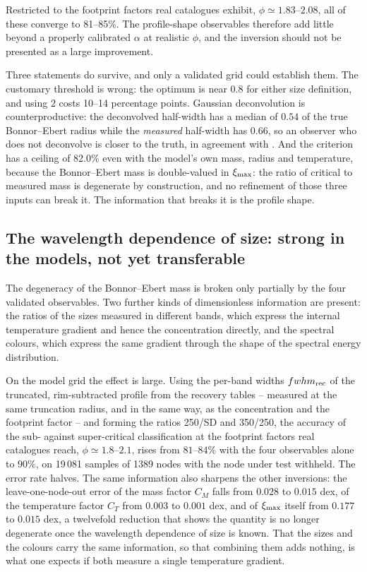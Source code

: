 \documentclass[11pt,a4paper]{article}
\begin{document}
Restricted to the footprint factors real catalogues exhibit, $\phi\simeq
1.83$--$2.08$, all of these converge to 81--85\%. The profile-shape
observables therefore add little beyond a properly calibrated $\alpha$ at
realistic $\phi$, and the inversion should not be presented as a large
improvement.

Three statements do survive, and only a validated grid could establish them.
The customary threshold is wrong: the optimum is near $0.8$ for either size
definition, and using $2$ costs 10--14 percentage points. Gaussian
deconvolution is counterproductive: the deconvolved half-width has a median of
$0.54$ of the true Bonnor--Ebert radius while the \emph{measured} half-width has
$0.66$, so an observer who does not deconvolve is closer to the truth, in
agreement with \citet{Menshchikov2023}. And the criterion has a ceiling of
82.0\% even with the model's own mass, radius and temperature, because the
Bonnor--Ebert mass is double-valued in $\xi_{\rm max}$: the ratio of critical to
measured mass is degenerate by construction, and no refinement of those three
inputs can break it. The information that breaks it is the profile shape.

\subsection{The wavelength dependence of size: strong in the models, not yet
transferable}
\label{sec:practice-chromatic}

The degeneracy of the Bonnor--Ebert mass is broken only partially by the four
validated observables. Two further kinds of dimensionless information are
present: the ratios of the sizes measured in different bands, which express the
internal temperature gradient and hence the concentration directly, and the
spectral colours, which express the same gradient through the shape of the
spectral energy distribution.

On the model grid the effect is large. Using the per-band widths
$fwhm_{\rm rec}$ of the truncated, rim-subtracted profile from the recovery
tables -- measured at the same truncation radius, and in the same way, as the
concentration and the footprint factor -- and forming the ratios 250/SD and
350/250, the accuracy of the sub- against super-critical classification at the
footprint factors real catalogues reach, $\phi\simeq1.8$--$2.1$, rises from
$81$--$84$\% with the four observables alone to $90$\%, on 19\,081 samples of
1389 nodes with the node under test withheld. The error rate halves. The same
information also sharpens the other inversions: the leave-one-node-out error of
the mass factor $C_M$ falls from $0.028$ to $0.015$ dex, of the temperature
factor $C_T$ from $0.003$ to $0.001$ dex, and of $\xi_{\rm max}$ itself from
$0.177$ to $0.015$ dex, a twelvefold reduction that shows the quantity is no
longer degenerate once the wavelength dependence of size is known. That the
sizes and the colours carry the same information, so that combining them adds
nothing, is what one expects if both measure a single temperature gradient.
\end{document}

